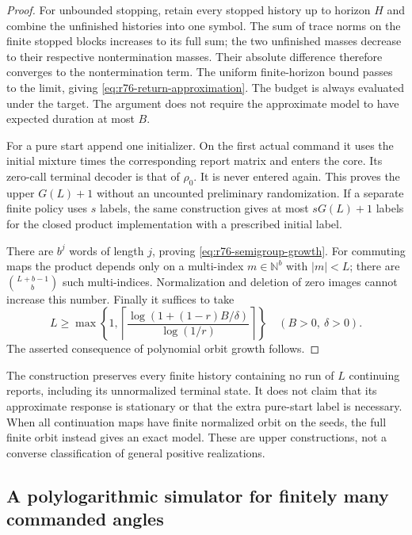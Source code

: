 \begin{proof}
For unbounded stopping, retain every stopped history up to horizon $H$
and combine the unfinished histories into one symbol.  The sum of trace
norms on the finite stopped blocks increases to its full sum; the two
unfinished masses decrease to their respective nontermination masses.
Their absolute difference therefore converges to the nontermination
term.  The uniform finite-horizon bound passes to the limit, giving
\eqref{eq:r76-return-approximation}.  The budget is always evaluated under
the target.  The argument does not require the approximate model to have
expected duration at most $B$.

For a pure start append one initializer.  On the first actual command it
uses the initial mixture times the corresponding report matrix and
enters the core.  Its zero-call terminal decoder is that of $\rho_0$.
It is never entered again.  This proves the upper $G(L)+1$ without an
uncounted preliminary randomization.  If a separate finite policy uses
$s$ labels, the same construction gives at most $sG(L)+1$ labels for
the closed product implementation with a prescribed initial label.

There are $b^j$ words of length $j$, proving
\eqref{eq:r76-semigroup-growth}.  For commuting maps the product depends
only on a multi-index $m\in\mathbb N^b$ with $|m|<L$; there are
$\binom{L+b-1}{b}$ such multi-indices.  Normalization and deletion of zero
images cannot increase this number.  Finally it suffices to take
\[
 L\ge
 \max\left\{1,
 \left\lceil\frac{\log(1+(1-r)B/\delta)}{\log(1/r)}\right\rceil\right\}
 \quad(B>0,\ \delta>0).
\]
The asserted consequence of polynomial orbit growth follows.
\end{proof}

The construction preserves every finite history containing no run of
$L$ continuing reports, including its unnormalized terminal state.
It does not claim that its approximate response is stationary or that
the extra pure-start label is necessary.  When all continuation maps
have finite normalized orbit on the seeds, the full finite orbit instead
gives an exact model.  These are upper constructions, not a converse
classification of general positive realizations.

\subsection{A polylogarithmic simulator for finitely many commanded angles}

